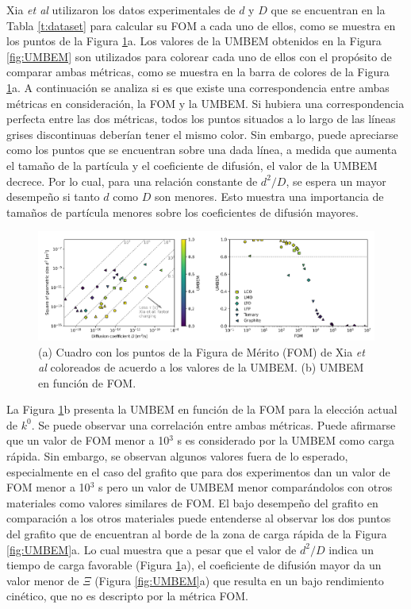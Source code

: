 Xia \textit{et al} \cite{xia2022} utilizaron los datos experimentales de $d$ y $D$
que se encuentran en la Tabla \ref{t:dataset} para calcular su FOM a cada uno 
de ellos, como se muestra en los puntos de la Figura \ref{fig:xiacomp}a. Los 
valores de la UMBEM obtenidos en la Figura \ref{fig:UMBEM} son utilizados para
colorear cada uno de ellos con el propósito de comparar ambas métricas, como
se muestra en la barra de colores de la Figura \ref{fig:xiacomp}a. A continuación
se analiza si es que existe una correspondencia entre ambas métricas en 
consideración, la FOM y la UMBEM. Si hubiera una correspondencia perfecta entre
las dos métricas, todos los puntos situados a lo largo de las líneas grises 
discontinuas deberían tener el mismo color. Sin embargo, puede apreciarse como 
los puntos que se encuentran sobre una dada línea, a medida que aumenta el tamaño
de la partícula y el coeficiente de difusión, el valor de la UMBEM decrece. Por
lo cual, para una relación constante de $d^2/D$, se espera un mayor desempeño 
si tanto $d$ como $D$ son menores. Esto muestra una importancia de tamaños de 
partícula menores sobre los coeficientes de difusión mayores.

\begin{figure}[h!]
    \centering
    \includegraphics[width=\textwidth]{FastCharging/umbem/xiacomp.png}
    \caption{(a) Cuadro con los puntos de la Figura de Mérito (FOM) de Xia 
    \textit{et al} coloreados de acuerdo a los valores de la UMBEM. (b) UMBEM en 
    función de FOM.}
    \label{fig:xiacomp}
\end{figure}

La Figura \ref{fig:xiacomp}b presenta la UMBEM en función de la FOM para la 
elección actual de $k^0$. Se puede observar una correlación entre ambas métricas.
Puede afirmarse que un valor de FOM menor a 10$^3$ s es considerado por la UMBEM 
como carga rápida. Sin embargo, se observan algunos valores fuera de lo esperado,
especialmente en el caso del grafito que para dos experimentos dan un valor de 
FOM menor a 10$^3$ s pero un valor de UMBEM menor comparándolos con otros 
materiales como valores similares de FOM. El bajo desempeño del grafito en 
comparación a los otros materiales puede entenderse al observar los dos puntos 
del grafito que de encuentran al borde de la zona de carga rápida de la Figura 
\ref{fig:UMBEM}a. Lo cual muestra que a pesar que el valor de $d^2/D$ indica
un tiempo de carga favorable (Figura \ref{fig:xiacomp}a), el coeficiente de 
difusión mayor da un valor menor de $\Xi$ (Figura \ref{fig:UMBEM}a) que resulta
en un bajo rendimiento cinético, que no es descripto por la métrica FOM.

